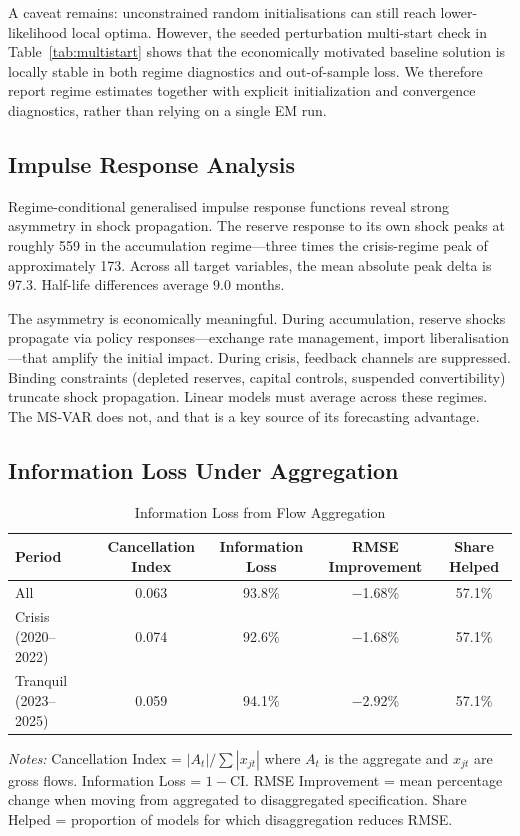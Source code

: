\documentclass[12pt,a4paper]{article}
\begin{document}
A caveat remains: unconstrained random initialisations can still reach lower-likelihood local optima. However, the seeded perturbation multi-start check in Table~\ref{tab:multistart} shows that the economically motivated baseline solution is locally stable in both regime diagnostics and out-of-sample loss. We therefore report regime estimates together with explicit initialization and convergence diagnostics, rather than relying on a single EM run.

\subsection{Impulse Response Analysis}

Regime-conditional generalised impulse response functions reveal strong asymmetry in shock propagation. The reserve response to its own shock peaks at roughly 559 in the accumulation regime---three times the crisis-regime peak of approximately 173. Across all target variables, the mean absolute peak delta is 97.3. Half-life differences average 9.0 months.

The asymmetry is economically meaningful. During accumulation, reserve shocks propagate via policy responses---exchange rate management, import liberalisation---that amplify the initial impact. During crisis, feedback channels are suppressed. Binding constraints (depleted reserves, capital controls, suspended convertibility) truncate shock propagation. Linear models must average across these regimes. The MS-VAR does not, and that is a key source of its forecasting advantage.

\subsection{Information Loss Under Aggregation}

\begin{table}[htbp]
\centering
\caption{Information Loss from Flow Aggregation}
\label{tab:info_loss}
\begin{tabular}{lcccc}
\toprule
Period & Cancellation Index & Information Loss & RMSE Improvement & Share Helped \\
\midrule
All & 0.063 & 93.8\% & $-$1.68\% & 57.1\% \\
Crisis (2020--2022) & 0.074 & 92.6\% & $-$1.68\% & 57.1\% \\
Tranquil (2023--2025) & 0.059 & 94.1\% & $-$2.92\% & 57.1\% \\
\bottomrule
\end{tabular}
\begin{tablenotes}
\small
\item \textit{Notes:} Cancellation Index = $|A_t|/\sum|x_{jt}|$ where $A_t$ is the aggregate and $x_{jt}$ are gross flows. Information Loss = $1 - \text{CI}$. RMSE Improvement = mean percentage change when moving from aggregated to disaggregated specification. Share Helped = proportion of models for which disaggregation reduces RMSE.
\end{tablenotes}
\end{table}
\end{document}
